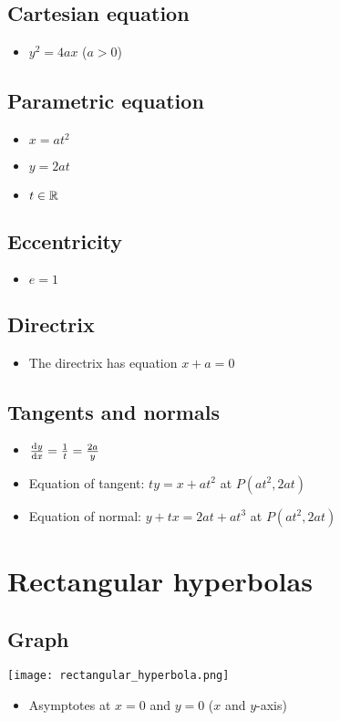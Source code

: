 \subsection{Cartesian equation}
\begin{itemize}
    \item $y^2=4ax$ ($a>0$)
\end{itemize}
\subsection{Parametric equation}
\begin{itemize}
    \item $x=at^2$
    \item $y=2at$
    \item $t\in \operatorname{\mathbb{R}}$
\end{itemize}
\subsection{Eccentricity}
\begin{itemize}
    \item $e=1$
\end{itemize}
\subsection{Directrix}
\begin{itemize}
    \item The directrix has equation $x+a=0$
\end{itemize}
\subsection{Tangents and normals}
\begin{itemize}
    \item $\frac{\operatorname{\mathrm{d}\mathit{y}}}{\operatorname{\mathrm{d}\mathit{x}}} = \frac{1}{t} = \frac{2a}{y}$
    \item Equation of tangent: $ty=x+at^2$ at $P(at^2, 2at)$
    \item Equation of normal: $y+tx=2at+at^3$ at $P(at^2, 2at)$
\end{itemize}

\section{Rectangular hyperbolas}
\subsection{Graph}
\texttt{[image: rectangular\_hyperbola.png]}
\begin{itemize}
    \item Asymptotes at $x=0$ and $y=0$ ($x$ and $y$-axis)
\end{itemize}
